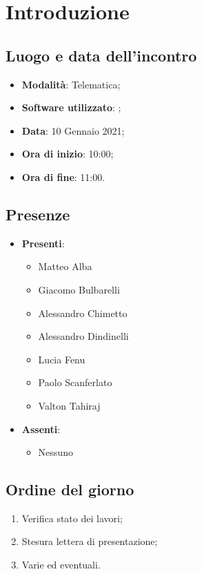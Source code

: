 \documentclass[]{article}
\begin{document}
	
	
	
	\newpage
	
	
		\section{Introduzione}
		\subsection{Luogo e data dell'incontro}
		\begin{itemize}
			\item \textbf{Modalità}: Telematica;
			\item \textbf{Software utilizzato}: ;
			\item \textbf{Data}: 10 Gennaio 2021;
			\item \textbf{Ora di inizio}: 10:00;
			\item \textbf{Ora di fine}: 11:00.
		\end{itemize}

		\subsection{Presenze}
		\begin{itemize}
			\item \textbf{Presenti}:
			\begin{itemize}
				\item Matteo Alba
				\item Giacomo Bulbarelli
				\item Alessandro Chimetto
				\item Alessandro Dindinelli
				\item Lucia Fenu
				\item Paolo Scanferlato
				\item Valton Tahiraj
			\end{itemize}
			\item \textbf{Assenti}:
			\begin{itemize}
				\item Nessuno
			\end{itemize}
		\end{itemize}


		\subsection{Ordine del giorno}
		\begin{enumerate}
			\item Verifica stato dei lavori;
			\item Stesura lettera di presentazione;
			\item Varie ed eventuali.
		\end{enumerate}
\end{document}
